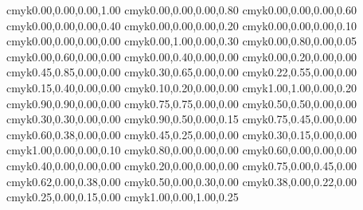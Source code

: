 %
%
%
%
\definecolor{black}              {cmyk}{0.00,0.00,0.00,1.00}
\definecolor{verydarkgrey}       {cmyk}{0.00,0.00,0.00,0.80}
\definecolor{darkgrey}           {cmyk}{0.00,0.00,0.00,0.60}
\definecolor{grey}               {cmyk}{0.00,0.00,0.00,0.40}
\definecolor{lightgrey}          {cmyk}{0.00,0.00,0.00,0.20}
\definecolor{verylightgrey}      {cmyk}{0.00,0.00,0.00,0.10}
\definecolor{white}              {cmyk}{0.00,0.00,0.00,0.00}
\definecolor{verydarkmagenta}    {cmyk}{0.00,1.00,0.00,0.30}
\definecolor{darkmagenta}        {cmyk}{0.00,0.80,0.00,0.05}
\definecolor{magenta}            {cmyk}{0.00,0.60,0.00,0.00}
\definecolor{lightmagenta}       {cmyk}{0.00,0.40,0.00,0.00}
\definecolor{verylightmagenta}   {cmyk}{0.00,0.20,0.00,0.00}
\definecolor{verydarkviolet}     {cmyk}{0.45,0.85,0.00,0.00}
\definecolor{darkviolet}         {cmyk}{0.30,0.65,0.00,0.00}
\definecolor{violet}             {cmyk}{0.22,0.55,0.00,0.00}
\definecolor{lightviolet}        {cmyk}{0.15,0.40,0.00,0.00}
\definecolor{verylightviolet}    {cmyk}{0.10,0.20,0.00,0.00}
\definecolor{verydarkblue}       {cmyk}{1.00,1.00,0.00,0.20}
\definecolor{darkblue}           {cmyk}{0.90,0.90,0.00,0.00}
\definecolor{blue}               {cmyk}{0.75,0.75,0.00,0.00}
\definecolor{lightblue}          {cmyk}{0.50,0.50,0.00,0.00}
\definecolor{verylightblue}      {cmyk}{0.30,0.30,0.00,0.00}
\definecolor{verydarkskyblue}    {cmyk}{0.90,0.50,0.00,0.15}
\definecolor{darkskyblue}        {cmyk}{0.75,0.45,0.00,0.00}
\definecolor{skyblue}            {cmyk}{0.60,0.38,0.00,0.00}
\definecolor{lightskyblue}       {cmyk}{0.45,0.25,0.00,0.00}
\definecolor{verylightskyblue}   {cmyk}{0.30,0.15,0.00,0.00}
\definecolor{verydarkcyan}       {cmyk}{1.00,0.00,0.00,0.10}
\definecolor{darkcyan}           {cmyk}{0.80,0.00,0.00,0.00}
\definecolor{cyan}               {cmyk}{0.60,0.00,0.00,0.00}
\definecolor{lightcyan}          {cmyk}{0.40,0.00,0.00,0.00}
\definecolor{verylightcyan}      {cmyk}{0.20,0.00,0.00,0.00}
\definecolor{verydarkseagreen}   {cmyk}{0.75,0.00,0.45,0.00}
\definecolor{darkseagreen}       {cmyk}{0.62,0.00,0.38,0.00}
\definecolor{seagreen}           {cmyk}{0.50,0.00,0.30,0.00}
\definecolor{lightseagreen}      {cmyk}{0.38,0.00,0.22,0.00}
\definecolor{verylightseagreen}  {cmyk}{0.25,0.00,0.15,0.00}
\definecolor{verydarkgreen}      {cmyk}{1.00,0.00,1.00,0.25}
